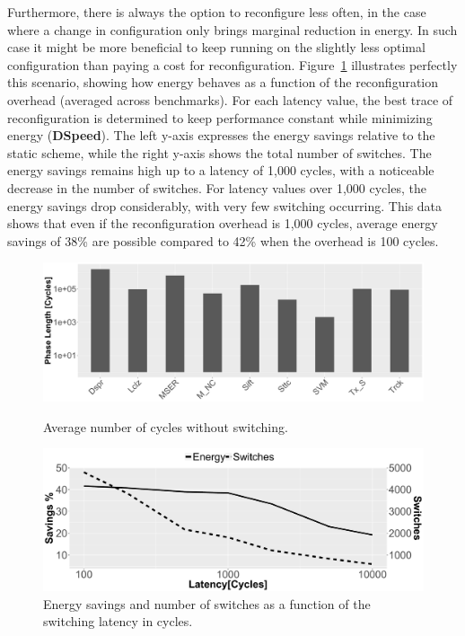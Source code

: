 Furthermore, there is always the option to reconfigure less often, in the case where a change in configuration only brings marginal reduction in energy.
In such case it might be more beneficial to keep running on the slightly less optimal configuration than paying a cost for reconfiguration.
Figure~\ref{fig:enlatency} illustrates perfectly this scenario, showing how energy behaves as a function of the reconfiguration overhead (averaged across benchmarks).
For each latency value, the best trace of reconfiguration is determined to keep performance constant while minimizing energy (\textbf{DSpeed}).
The left y-axis expresses the energy savings relative to the static scheme, while the right y-axis shows the total number of switches.
The energy savings remains high up to a latency of 1,000 cycles, with a noticeable decrease in the number of switches.
For latency values over 1,000 cycles, the energy savings drop considerably, with very few switching occurring.
This data shows that even if the reconfiguration overhead is 1,000 cycles, average energy savings of 38\% are possible compared to 42\% when the overhead is 100 cycles.

\begin{figure}[t]
    \centering
	\begin{minipage}{.5\textwidth}
	\includegraphics[width=.9\linewidth]{cases-paper/graphics/Exploration/phase_len2.pdf}
    \caption{Average number of cycles without switching.}
    \label{fig:avlen}
	\end{minipage}%
	\begin{minipage}{.5\textwidth}
	\includegraphics[width=.9\linewidth]{cases-paper/graphics/Exploration/latency_en_sp_sw2.pdf}
    \caption{Energy savings and number of switches as a function of the switching latency in cycles.}
    \label{fig:enlatency}
\end{minipage}
\vspace{5mm}
\end{figure}

